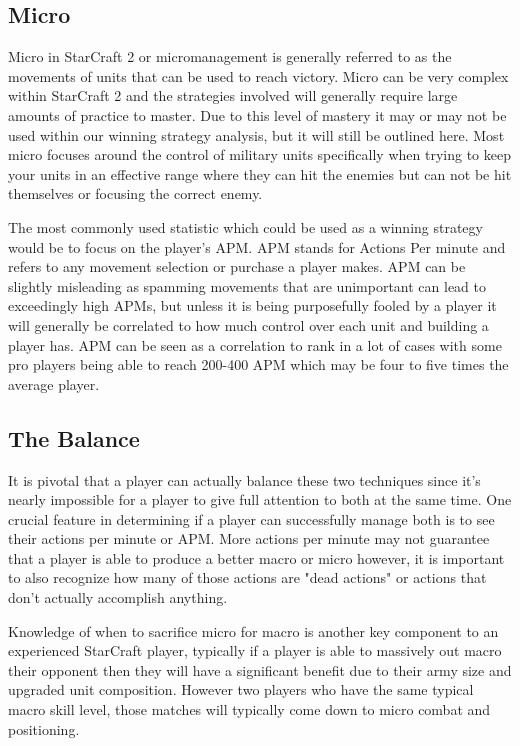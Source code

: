 \documentclass[a4paper,12pt]{report}
\begin{document}
\subsection{Micro}

Micro in StarCraft 2 or micromanagement is generally referred to as the movements of units that can be used to reach victory.  Micro can be very complex within StarCraft 2 and the strategies involved will generally require large amounts of practice to master. Due to this level of mastery it may or may not be used within our winning strategy analysis, but it will still be outlined here. Most micro focuses around the control of military units specifically when trying to keep your units in an effective range where they can hit the enemies but can not be hit themselves or focusing the correct enemy.

The most commonly used statistic which could be used as a winning strategy would be to focus on the player’s APM. APM stands for Actions Per minute and refers to any movement selection or purchase a player makes. APM can be slightly misleading as spamming movements that are unimportant can lead to exceedingly high APMs, but unless it is being purposefully fooled by a player it will generally be correlated to how much control over each unit and building a player has. APM can be seen as a correlation to rank in a lot of cases with some pro players being able to reach 200-400 APM which may be four to five times the average player.

\subsection{The Balance}

It is pivotal that a player can actually balance these two techniques since it’s nearly impossible for a player to give full attention to both at the same time. One crucial feature in determining if a player can successfully manage both is to see their actions per minute or APM. More actions per minute may not guarantee that a player is able to produce a better macro or micro however, it is important to also recognize how many of those actions are "dead actions" or actions that don’t actually accomplish anything.

Knowledge of when to sacrifice micro for macro is another key component to an experienced StarCraft player, typically if a player is able to massively out macro their opponent then they will have a significant benefit due to their army size and upgraded unit composition. However two players who have the same typical macro skill level, those matches will typically come down to micro combat and positioning.
\end{document}
